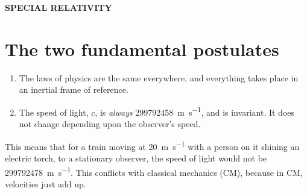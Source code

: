 \documentclass[10pt]{article}
\begin{document}
\begin{center}
{\Huge \textbf{SPECIAL RELATIVITY}}
\end{center}
\nocite{*}

\section{The two fundamental postulates}
\begin{enumerate}
    \item The laws of physics are the same everywhere, and everything takes place in an inertial frame of reference.
    \item The speed of light, \(c\), is \emph{always} \qty{299 792 458}{\metre\per\second}, and is invariant. It does not change depending upon the observer's speed.
\end{enumerate}
This means that for a train moving at \qty{20}{\metre\per\second} with a person on it shining an electric torch, to a stationary observer, the speed of light would not be \qty{299 792 478}{\metre\per\second}. This conflicts with classical mechanics (CM), because in CM, velocities just add up.
\end{document}
